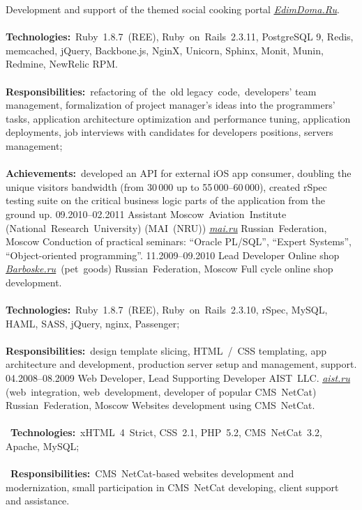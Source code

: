 \documentclass[12pt,a4paper,final]{moderncv}
\begin{document}
{
  Development and support of the themed social cooking portal \underline{\href{http://www.edimdoma.ru}{\itshape EdimDoma.Ru}}.
  \\\\
  \textbf{Technologies:}~Ruby~1.8.7~(REE), Ruby~on~Rails~2.3.11, PostgreSQL 9, Redis, memcached, jQuery, Backbone.js, NginX, Unicorn, Sphinx, Monit, Munin, Redmine, NewRelic RPM.
  \\\\
  \textbf{Responsibilities:}~refactoring of~the~old legacy~code,~developers' team management, formalization of project manager's ideas into the programmers' tasks, application architecture optimization and performance tuning, application deployments, job interviews with candidates for developers positions, servers management;
  \\\\
  \textbf{Achievements:}~developed an API for external iOS app consumer, doubling the unique visitors bandwidth (from 30\,000 up to 55\,000--60\,000), created rSpec testing suite on the critical business logic parts of the application from the ground up.
}
%
\cventry
{09.2010--02.2011}
{Assistant}
{Moscow~Aviation~Institute (National~Research~University) (MAI~(NRU)) \underline{\href{http://mai.ru}{\itshape mai.ru}}}
{Russian~Federation, Moscow}
{}
{
  Conduction of practical seminars: ``Oracle PL/SQL'', ``Expert Systems'', ``Object-oriented programming''.
}
%
\cventry
{11.2009--09.2010}
{Lead Developer}
{Online shop \underline{\href{http://barboske.ru}{\itshape Barboske.ru}}~(pet~goods)}
{Russian~Federation, Moscow}
{}
{
  Full cycle online shop development.
  \\\\
  \textbf{Technologies:}~Ruby~1.8.7~(REE), Ruby~on~Rails~2.3.10, rSpec, MySQL, HAML, SASS, jQuery, nginx, Passenger;
  \\\\
  \textbf{Responsibilities:}~design template slicing, HTML~/~CSS templating, app architecture and development, production server setup and management, support.
}
%
\cventry
{04.2008--08.2009}
{Web Developer, Lead Supporting Developer}
{
  AIST~LLC. \underline{\href{http://aist.ru}{\itshape aist.ru}} (web~integration, web~development, developer of popular CMS~NetCat)
}
{Russian~Federation, Moscow}
{}
{
Websites development using CMS~NetCat.\\\\\
\textbf{Technologies:}~xHTML~4~Strict, CSS~2.1, PHP~5.2, CMS~NetCat~3.2, Apache, MySQL;\\\\\
\textbf{Responsibilities:}~CMS~NetCat-based websites development and modernization, small participation in CMS~NetCat developing, client support and assistance.
}
\end{document}
